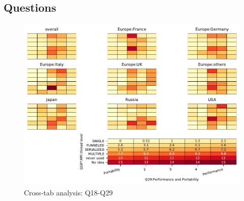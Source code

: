 
\subsection{Questions}


\begin{figure}
\begin{center}
\includegraphics[width=12cm]{../pdfs/Q18-Q29.pdf}
\caption{Cross-tab analysis: Q18-Q29}
\label{fig:Q18-Q29}
\end{center}
\end{figure}
